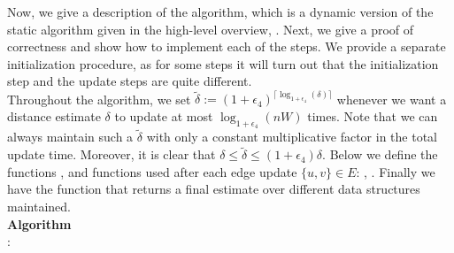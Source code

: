 \documentclass[11pt]{article}
\theoremstyle{definition}
\theoremstyle{remark}
\begin{document}
\begin{titlepage}
Now, we give a description of the algorithm, which is a dynamic version of the static algorithm given in the high-level overview, . Next, we give a proof of correctness and show how to implement each of the steps. We provide a separate initialization procedure, as for some steps it will turn out that the initialization step and the update steps are quite different.\\
Throughout the algorithm, we set $\tilde\delta := (1+\epsilon_4)^{\lceil \log_{1+\epsilon_4}(\delta)\rceil}$ whenever we want a distance estimate $\delta$ to update at most $\log_{1+\epsilon_4}(nW)$ times. Note that we can always maintain such a $\tilde \delta$ with only a constant multiplicative factor in the total update time. Moreover, it is clear that $\delta \leq \tilde \delta \leq (1+\epsilon_4)\delta$.
Below we define the functions \Initialization{}, and functions used after each edge update $\{u,v\}\in E$: , . Finally we have the \Query{} function that returns a final estimate over different data structures maintained. 
\\ 

\noindent
\textbf{Algorithm} \\
\Initialization{}:


\end{titlepage}
\end{document}

